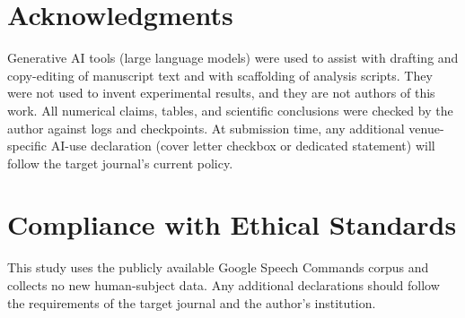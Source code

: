 \documentclass[journal]{IEEEtran}
\begin{document}
\section*{Acknowledgments}

Generative AI tools (large language models) were used to assist with
drafting and copy-editing of manuscript text and with scaffolding of
analysis scripts.
They were not used to invent experimental results, and they are not
authors of this work.
All numerical claims, tables, and scientific conclusions were
checked by the author against logs and checkpoints.
At submission time, any additional venue-specific AI-use declaration
(cover letter checkbox or dedicated statement) will follow the
target journal's current policy.

\section*{Compliance with Ethical Standards}

This study uses the publicly available Google Speech Commands
corpus and collects no new human-subject data.
Any additional declarations should follow the requirements of
the target journal and the author's institution.



\end{document}
